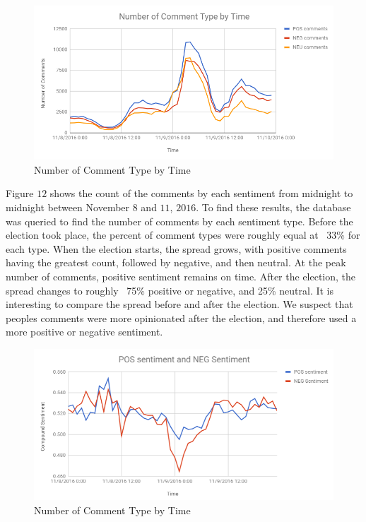 \documentclass[letterpaper]{article}
\begin{document}
\begin{figure}[!htb]
\begin{center}
\includegraphics[scale=0.4]{comment_count_sentiment.PNG}
\caption{Number of Comment Type by Time}
\label{fig1}
\end{center}
\end{figure}

Figure $12$ shows the count of the comments by each sentiment from midnight to midnight between November $8$ and $11$, $2016$. To find these results, the database was queried to find the number of comments by each sentiment type. Before the election took place, the percent of comment types were roughly equal at ~33\% for each type. When the election starts, the spread grows, with positive comments having the greatest count, followed by negative, and then neutral. At the peak number of comments, positive sentiment remains on time. After the election, the spread changes to roughly ~75\% positive or negative, and 25\% neutral. It is interesting to compare the spread before and after the election. We suspect that peoples comments were more opinionated after the election, and therefore used a more positive or negative sentiment.

\begin{figure}[!htb]
\begin{center}
\includegraphics[scale=0.4]{pos_neg_sentiment.PNG}
\caption{Number of Comment Type by Time}
\label{fig1}
\end{center}
\end{figure}
\end{document}
